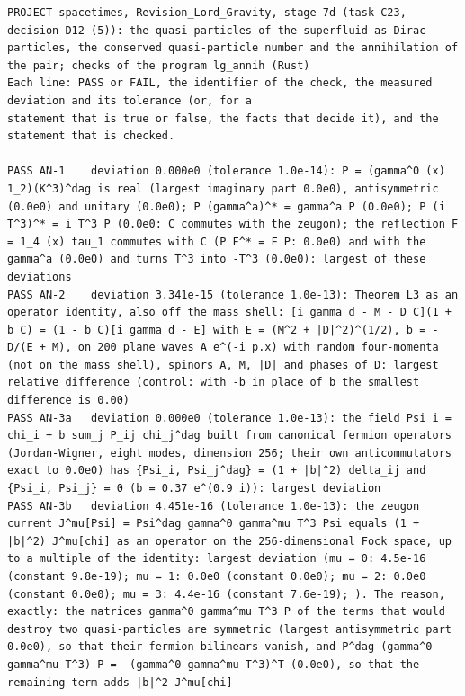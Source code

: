\documentclass[
  10pt,
]{article}
\begin{document}
\begin{verbatim}
PROJECT spacetimes, Revision_Lord_Gravity, stage 7d (task C23, decision D12 (5)): the quasi-particles of the superfluid as Dirac particles, the conserved quasi-particle number and the annihilation of the pair; checks of the program lg_annih (Rust)
Each line: PASS or FAIL, the identifier of the check, the measured deviation and its tolerance (or, for a
statement that is true or false, the facts that decide it), and the statement that is checked.

PASS AN-1    deviation 0.000e0 (tolerance 1.0e-14): P = (gamma^0 (x) 1_2)(K^3)^dag is real (largest imaginary part 0.0e0), antisymmetric (0.0e0) and unitary (0.0e0); P (gamma^a)^* = gamma^a P (0.0e0); P (i T^3)^* = i T^3 P (0.0e0: C commutes with the zeugon); the reflection F = 1_4 (x) tau_1 commutes with C (P F^* = F P: 0.0e0) and with the gamma^a (0.0e0) and turns T^3 into -T^3 (0.0e0): largest of these deviations
PASS AN-2    deviation 3.341e-15 (tolerance 1.0e-13): Theorem L3 as an operator identity, also off the mass shell: [i gamma d - M - D C](1 + b C) = (1 - b C)[i gamma d - E] with E = (M^2 + |D|^2)^(1/2), b = -D/(E + M), on 200 plane waves A e^(-i p.x) with random four-momenta (not on the mass shell), spinors A, M, |D| and phases of D: largest relative difference (control: with -b in place of b the smallest difference is 0.00)
PASS AN-3a   deviation 0.000e0 (tolerance 1.0e-13): the field Psi_i = chi_i + b sum_j P_ij chi_j^dag built from canonical fermion operators (Jordan-Wigner, eight modes, dimension 256; their own anticommutators exact to 0.0e0) has {Psi_i, Psi_j^dag} = (1 + |b|^2) delta_ij and {Psi_i, Psi_j} = 0 (b = 0.37 e^(0.9 i)): largest deviation
PASS AN-3b   deviation 4.451e-16 (tolerance 1.0e-13): the zeugon current J^mu[Psi] = Psi^dag gamma^0 gamma^mu T^3 Psi equals (1 + |b|^2) J^mu[chi] as an operator on the 256-dimensional Fock space, up to a multiple of the identity: largest deviation (mu = 0: 4.5e-16 (constant 9.8e-19); mu = 1: 0.0e0 (constant 0.0e0); mu = 2: 0.0e0 (constant 0.0e0); mu = 3: 4.4e-16 (constant 7.6e-19); ). The reason, exactly: the matrices gamma^0 gamma^mu T^3 P of the terms that would destroy two quasi-particles are symmetric (largest antisymmetric part 0.0e0), so that their fermion bilinears vanish, and P^dag (gamma^0 gamma^mu T^3) P = -(gamma^0 gamma^mu T^3)^T (0.0e0), so that the remaining term adds |b|^2 J^mu[chi]

\end{verbatim}
\end{document}
